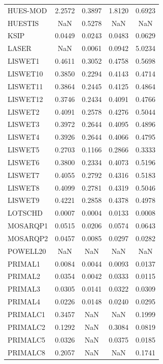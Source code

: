 \begin{longtable}{lcccc}
HUES-MOD &   2.2572 &   0.3897 &   1.8120 &   0.6923 \\
HUESTIS  &      NaN &   0.5278 &      NaN &      NaN \\
KSIP     &   0.0449 &   0.0243 &   0.0483 &   0.0629 \\
LASER    &      NaN &   0.0061 &   0.0942 &   5.0234 \\
LISWET1  &   0.4611 &   0.3052 &   0.4758 &   0.5698 \\
LISWET10 &   0.3850 &   0.2294 &   0.4143 &   0.4714 \\
LISWET11 &   0.3864 &   0.2445 &   0.4125 &   0.4864 \\
LISWET12 &   0.3746 &   0.2434 &   0.4091 &   0.4766 \\
LISWET2  &   0.4091 &   0.2578 &   0.4276 &   0.5044 \\
LISWET3  &   0.3972 &   0.2644 &   0.4095 &   0.4896 \\
LISWET4  &   0.3926 &   0.2644 &   0.4066 &   0.4795 \\
LISWET5  &   0.2703 &   0.1166 &   0.2866 &   0.3333 \\
LISWET6  &   0.3800 &   0.2334 &   0.4073 &   0.5196 \\
LISWET7  &   0.4055 &   0.2792 &   0.4316 &   0.5183 \\
LISWET8  &   0.4099 &   0.2781 &   0.4319 &   0.5046 \\
LISWET9  &   0.4221 &   0.2858 &   0.4378 &   0.4978 \\
LOTSCHD  &   0.0007 &   0.0004 &   0.0133 &   0.0008 \\
MOSARQP1 &   0.0515 &   0.0206 &   0.0574 &   0.0643 \\
MOSARQP2 &   0.0457 &   0.0085 &   0.0297 &   0.0282 \\
POWELL20 &      NaN &      NaN &      NaN &      NaN \\
PRIMAL1  &   0.0084 &   0.0044 &   0.0093 &   0.0137 \\
PRIMAL2  &   0.0354 &   0.0042 &   0.0333 &   0.0115 \\
PRIMAL3  &   0.0305 &   0.0141 &   0.0322 &   0.0309 \\
PRIMAL4  &   0.0226 &   0.0148 &   0.0240 &   0.0295 \\
PRIMALC1 &   0.3457 &      NaN &      NaN &   0.1999 \\
PRIMALC2 &   0.1292 &      NaN &   0.3084 &   0.0819 \\
PRIMALC5 &   0.0326 &      NaN &   0.0375 &   0.0185 \\
PRIMALC8 &   0.2057 &      NaN &      NaN &   0.1741 \\

\end{longtable}
